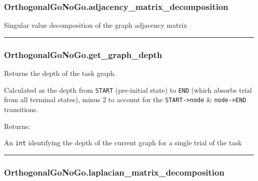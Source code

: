 \subsubsection{OrthogonalGoNoGo.adjacency\_matrix\_decomposition}\label{orthogonalgonogo.adjacency_matrix_decomposition}

\begin{Shaded}
\begin{Highlighting}[]
\NormalTok{)}
\end{Highlighting}
\end{Shaded}

Singular value decomposition of the graph adjacency matrix

\begin{center}\rule{0.5\linewidth}{\linethickness}\end{center}

\subsubsection{OrthogonalGoNoGo.get\_graph\_depth}\label{orthogonalgonogo.get_graph_depth}

\begin{Shaded}
\begin{Highlighting}[]
\NormalTok{)}
\end{Highlighting}
\end{Shaded}

Returns the depth of the task graph.

Calculated as the depth from \texttt{START} (pre-initial state) to
\texttt{END} (which absorbs trial from all terminal states), minus 2 to
account for the \texttt{START-\textgreater{}node} \&
\texttt{node-\textgreater{}END} transitions.

Returns:

An \texttt{int} identifying the depth of the current graph for a single
trial of the task

\begin{center}\rule{0.5\linewidth}{\linethickness}\end{center}

\subsubsection{OrthogonalGoNoGo.laplacian\_matrix\_decomposition}\label{orthogonalgonogo.laplacian_matrix_decomposition}

